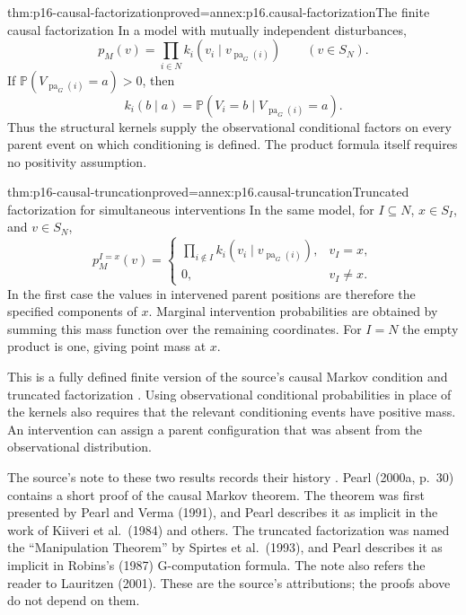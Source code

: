\begin{hbtheorem}{thm:p16-causal-factorization}{proved=annex:p16.causal-factorization}{The finite causal factorization}
In a model with mutually independent disturbances,
\[
 p_M(v)=\prod_{i\in N}k_i(v_i\mid v_{\operatorname{pa}_G(i)})
 \qquad(v\in S_N).
\]
If \(\mathbb P(V_{\operatorname{pa}_G(i)}=a)>0\), then
\[
 k_i(b\mid a)=
 \mathbb P(V_i=b\mid V_{\operatorname{pa}_G(i)}=a).
\]
Thus the structural kernels supply the observational conditional factors
on every parent event on which conditioning is defined. The product formula
itself requires no positivity assumption.
\end{hbtheorem}

\begin{hbtheorem}{thm:p16-causal-truncation}{proved=annex:p16.causal-truncation}{Truncated factorization for simultaneous interventions}
In the same model, for \(I\subseteq N\), \(x\in S_I\), and
\(v\in S_N\),
\[
 p_M^{I=x}(v)=
 \begin{cases}
 \displaystyle\prod_{i\notin I}k_i(v_i\mid v_{\operatorname{pa}_G(i)}),
       &v_I=x,\\[1ex]
 0,    &v_I\ne x.
 \end{cases}
\]
In the first case the values in intervened parent positions are therefore
the specified components of \(x\). Marginal intervention probabilities
are obtained by summing this mass function over the remaining coordinates.
For \(I=N\) the empty product is one, giving point mass at \(x\).
\end{hbtheorem}

This is a fully defined finite version of the source's causal Markov
condition and truncated factorization
\cite[Theorem~1 and Corollary~1, pp.~110--111]{Pearl2009CausalOverview}.
Using observational conditional probabilities in place of the kernels
also requires that the relevant conditioning events have positive mass.
An intervention can assign a parent configuration that was absent from
the observational distribution.

The source's note to these two results records their history
\cite[p.~111, n.~8]{Pearl2009CausalOverview}. Pearl (2000a, p.~30)
contains a short proof of the causal Markov theorem. The theorem was
first presented by Pearl and Verma (1991), and Pearl describes it as
implicit in the work of Kiiveri et al.\ (1984) and others. The truncated
factorization was named the ``Manipulation Theorem'' by Spirtes et
al.\ (1993), and Pearl describes it as implicit in Robins's (1987)
G-computation formula. The note also refers the reader to Lauritzen
(2001). These are the source's attributions; the proofs above do not
depend on them.

